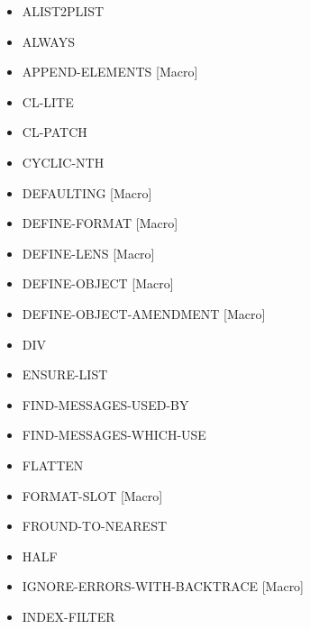 \documentclass [11pt]{book}
\begin{document}
\begin{itemize}

\item {}ALIST2PLIST

\item {}ALWAYS

\item {}APPEND-ELEMENTS [Macro]

\item {}CL-LITE

\item {}CL-PATCH

\item {}CYCLIC-NTH

\item {}DEFAULTING [Macro]

\item {}DEFINE-FORMAT [Macro]

\item {}DEFINE-LENS [Macro]

\item {}DEFINE-OBJECT [Macro]

\item {}DEFINE-OBJECT-AMENDMENT [Macro]

\item {}DIV

\item {}ENSURE-LIST

\item {}FIND-MESSAGES-USED-BY

\item {}FIND-MESSAGES-WHICH-USE

\item {}FLATTEN

\item {}FORMAT-SLOT [Macro]

\item {}FROUND-TO-NEAREST

\item {}HALF

\item {}IGNORE-ERRORS-WITH-BACKTRACE [Macro]

\item {}INDEX-FILTER


\end{itemize}
\end{document}
